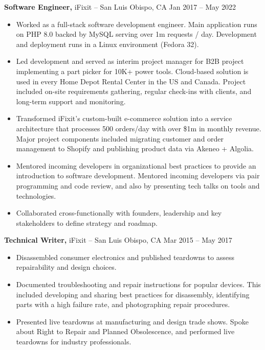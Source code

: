 \documentclass[11pt]{article}       %
\begin{document}
\textbf{Software Engineer,} {iFixit} -- San Luis Obispo, CA \hfill Jan 2017 -- May 2022 \\
\vspace{-9pt}
\begin{itemize}
  \item Worked as a full-stack software development engineer. Main application runs on PHP 8.0 backed by MySQL serving over 1m requests / day. Development and deployment runs in a Linux environment (Fedora 32). \\
  \item Led development and served as interim project manager for B2B project implementing a part picker for 10K+ power tools. Cloud-based solution is used in every Home Depot Rental Center in the US and Canada. Project included on-site requirements gathering, regular check-ins with clients, and long-term support and monitoring. \\
  \item Transformed iFixit’s custom-built e-commerce solution into a service architecture that processes 500 orders/day with over \$1m in monthly revenue. Major project components included migrating customer and order management to Shopify and publishing product data via Akeneo + Algolia. \\
  \item Mentored incoming developers in organizational best practices to provide an introduction to software development. Mentored incoming developers via pair programming and code review, and also by presenting tech talks on tools and technologies. \\
  \item Collaborated cross-functionally with founders, leadership and key stakeholders to define strategy and roadmap. \\
\end{itemize}

\textbf{Technical Writer,} {iFixit} -- San Luis Obispo, CA \hfill Mar 2015 -- May 2017 \\
\vspace{-9pt}
\begin{itemize}
  \item Disassembled consumer electronics and published teardowns to assess repairability and design choices. \\
  \item Documented troubleshooting and repair instructions for popular devices. This included developing and sharing best practices for disassembly, identifying parts with a high failure rate, and photographing repair procedures. \\
  \item Presented live teardowns at manufacturing and design trade shows. Spoke about Right to Repair and Planned Obsolescence, and performed live teardowns for industry professionals. \\
\end{itemize}
\end{document}
